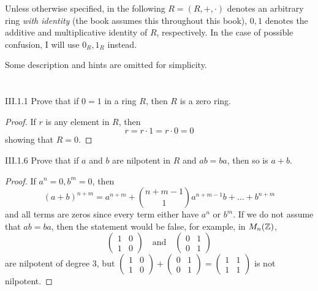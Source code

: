 Unless otherwise specified, in the following $R = (R,+,\cdot)$ denotes an arbitrary ring \emph{with identity} (the book assumes this throughout this book), $0, 1$ denotes the additive and multiplicative identity of $R$, respectively. In the case of possible confusion, I will use $0_R, 1_R$ instead.

Some description and hints are omitted for simplicity.

\section{}

\begin{problem}{III.1.1}
Prove that if $0 = 1$ in a ring $R$, then $R$ is a zero ring.
\end{problem}
\begin{proof}
If $r$ is any element in $R$, then
\[
r = r \cdot 1 = r \cdot 0 = 0
\]
showing that $R = 0$.
\end{proof}
\begin{problem}{III.1.6}
Prove that if $a$ and $b$ are nilpotent in $R$ and $ab = ba$, then so is $a+b$.
\end{problem}
\begin{proof}
If $a^n = 0, b^m = 0$, then
\[
(a+b)^{n+m} = a^{n+m} +\binom{n+m-1}{1} a^{n+m-1}b + \dotsc + b^{n+m}
\]
and all terms are zeros since every term either have $a^n$ or $b^m$. If we do not assume that $ab = ba$, then the statement would be false, for example, in $M_n(\mathbb{Z})$,
\[
\begin{pmatrix}
1 & 0 \\
1 & 0
\end{pmatrix}
\quad \text{and} \quad
\begin{pmatrix}
0 & 1 \\
0 & 1
\end{pmatrix}
\]
are nilpotent of degree $3$, but
$\begin{pmatrix}
1 & 0 \\
1 & 0
\end{pmatrix} +
\begin{pmatrix}
0 & 1 \\
0 & 1
\end{pmatrix} =
\begin{pmatrix}
1 & 1 \\
1 & 1
\end{pmatrix}$ is not nilpotent.
\end{proof}

